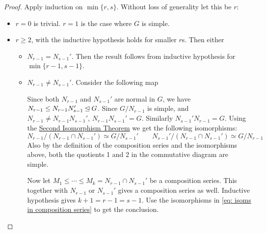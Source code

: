 \documentclass{article}
\begin{document}
\begin{proof}
    Apply induction on $\min\{r, s\}$. Without loss of generality let this be $r$:
    \begin{itemize}
        \item $r = 0$ is trivial. $r = 1$ is the case where $G$ is simple.
        \item $r \geq 2$, with the inductive hypothesis holds for smaller $r$s. Then either
        \begin{itemize}
            \item $N_{r-1} = N_{s-1}'$. Then the result follows from inductive hypothesis for $\min\{r-1, s-1\}$.
            \item $N_{r-1} \neq N_{s-1}'$. Consider the following map
            
            \begin{minipage}{\linewidth}
                \centering
            \end{minipage}
            Since both $N_{r-1}$ and $N_{s-1}'$ are normal in $G$, we have $N_{r-1} \leq N_{r-1} N_{s-1}' \unlhd G$. Since $G/N_{r-1}$ is simple, and $N_{r-1} \neq N_{r-1} N_{s-1}'$, $N_{r-1} N_{s-1}' = G$. Similarly $N_{s-1}' N_{r-1} = G$. Using the \hyperref[thm: second isomorphism theorem]{Second Isomorphism Theorem} we get the following isomorphisms:
            \begin{equation}\tag{$\ast$}\label{eq: isoms in composition series}
                N_{r-1}/(N_{r-1} \cap N_{s-1}') \simeq G/N_{s-1}' \qquad N_{s-1}'/(N_{r-1} \cap N_{s-1}') \simeq G/N_{r-1}
            \end{equation}
            Also by the definition of the composition series and the isomorphisms above, both the quotients 1 and 2 in the commutative diagram are simple.

            Now let $M_1 \leq \cdots \leq M_k= N_{r-1} \cap N_{s-1}'$ be a composition series. This together with $N_{r-1}$ or $N_{s-1}'$ gives a composition series as well. Inductive hypothesis gives $k+1 = r-1 = s-1$. Use the isomorphisms in \eqref{eq: isoms in composition series} to get the conclusion.
        \end{itemize}
    \end{itemize}
\end{proof}
\end{document}
